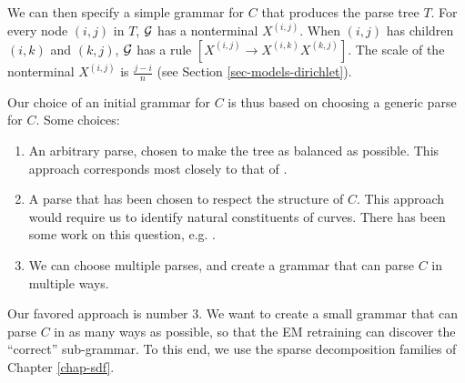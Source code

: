 We can then specify a simple grammar for $C$ that produces the parse
tree $T$. For every node $(i,j)$ in $T$, ${\mathcal G}$ has a nonterminal
$X^{(i,j)}$. When $(i,j)$ has children $(i,k)$ and $(k,j)$, ${\mathcal G}$ has
a rule $[X^{(i,j)} \to X^{(i,k)}X^{(k,j)}]$. The scale of the
nonterminal $X^{(i,j)}$ is $\frac{j-i}{n}$ (see Section \ref{sec-models-dirichlet}).

Our choice of an initial grammar for $C$ is thus based on choosing a
generic parse for $C$. Some choices:
\begin{enumerate}
\item An arbitrary parse, chosen to make the tree as balanced as
  possible. This approach corresponds most closely to that of
  \cite{hcm}.
\item A parse that has been chosen to respect the structure of
  $C$. This approach would require us to identify natural constituents
  of curves. There has been some work on this question, e.g. \cite{hoffman-richards}.
\item We can choose multiple parses, and create a grammar that can
  parse $C$ in multiple ways. 
\end{enumerate}

Our favored approach is number 3. We want to create a small grammar
that can parse $C$ in as many ways as possible, so that the EM
retraining can discover the ``correct'' sub-grammar. To this end, we
use the sparse decomposition families of Chapter \ref{chap-sdf}.




